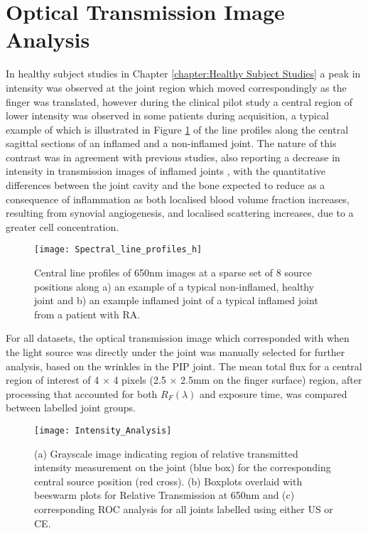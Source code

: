 \documentclass[twoside]{bhamthesis}
\theoremstyle{definition}
\begin{document}
\section{Optical Transmission Image Analysis}
\label{chapter:Optical Transmission Image Analysis}

In healthy subject studies in Chapter \ref{chapter:Healthy Subject Studies} a peak in intensity was observed at the joint region which moved correspondingly as the finger was translated, however during the clinical pilot study a central region of lower intensity was observed in some patients during acquisition, a typical example of which is illustrated in Figure \ref{fig:Spectral_line_profiles_h} of the line profiles along the central sagittal sections of an inflamed and a non-inflamed joint. The nature of this contrast was in agreement with previous studies, also reporting a decrease in intensity in transmission images of inflamed joints \cite{hielscher2003assessment}, with the quantitative differences between the joint cavity and the bone expected to reduce as a consequence of inflammation as both localised blood volume fraction increases, resulting from synovial angiogenesis, and localised scattering increases, due to a greater cell concentration.

\begin{figure}[!ht]
\centering\texttt{[image: Spectral\_line\_profiles\_h]}\caption{Central line profiles of 650nm images at a sparse set of 8 source positions along a) an example of a typical non-inflamed, healthy joint and b) an example inflamed joint of a typical inflamed joint from a patient with RA.}
\label{fig:Spectral_line_profiles_h}
\end{figure}

For all datasets, the optical transmission image which corresponded with when the light source was directly under the joint was manually selected for further analysis, based on the wrinkles in the PIP joint. The mean total flux for a central region of interest of 4 $\times$ 4 pixels (2.5 $\times$ 2.5mm on the finger surface) region, after processing that accounted for both $R_F(\lambda)$ and exposure time, was compared between labelled joint groups. 

\begin{figure}[!ht]
\centering\texttt{[image: Intensity\_Analysis]}\caption{ (a) Grayscale image indicating region of relative transmitted intensity measurement on the joint (blue box) for the corresponding central source position (red cross). (b) Boxplots overlaid with beeswarm plots for Relative Transmission at 650nm and (c) corresponding ROC analysis for all joints labelled using either US or CE.}
\label{fig:Intensity_Analysis}
\end{figure}
\end{document}
